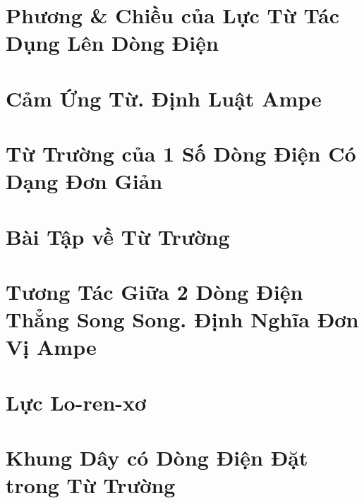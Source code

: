 \documentclass[oneside]{book}
\numberwithin{equation}{section}
\begin{document}

\section{Phương \& Chiều của Lực Từ Tác Dụng Lên Dòng Điện}


\section{Cảm Ứng Từ. Định Luật Ampe}


\section{Từ Trường của 1 Số Dòng Điện Có Dạng Đơn Giản}


\section{Bài Tập về Từ Trường}


\section{Tương Tác Giữa 2 Dòng Điện Thẳng Song Song. Định Nghĩa Đơn Vị Ampe}


\section{Lực Lo-ren-xơ}


\section{Khung Dây có Dòng Điện Đặt trong Từ Trường}

\end{document}
